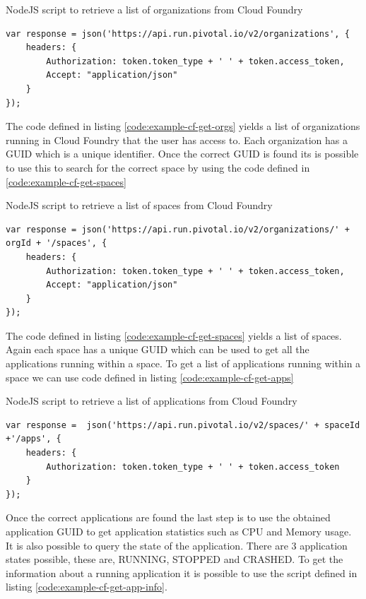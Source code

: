 \begin{listing}[H]
    \caption{NodeJS script to retrieve a list of organizations from Cloud Foundry}
    \label{code:example-cf-get-orgs}
    \begin{verbatim}
var response = json('https://api.run.pivotal.io/v2/organizations', {
    headers: {
        Authorization: token.token_type + ' ' + token.access_token,
        Accept: "application/json"
    }
});
\end{verbatim}
\end{listing}

The code defined in listing \ref{code:example-cf-get-orgs} yields a list of organizations running in Cloud Foundry that the user has access to. Each organization has a GUID which is a unique identifier. Once  the correct GUID is found its is possible to use this to search for the correct space by using the code defined in \ref{code:example-cf-get-spaces}

\begin{listing}[H]
    \caption{NodeJS script to retrieve a list of spaces from Cloud Foundry}
    \label{code:example-cf-get-spaces}
\begin{verbatim}
var response = json('https://api.run.pivotal.io/v2/organizations/' + orgId + '/spaces', {
    headers: {
        Authorization: token.token_type + ' ' + token.access_token,
        Accept: "application/json"
    }
});
\end{verbatim}
\end{listing}

The code defined in listing \ref{code:example-cf-get-spaces} yields a list of spaces. Again each space has a unique GUID which can be used to get all the applications running within a space. To get a list of applications running within a space we can use code defined in listing \ref{code:example-cf-get-apps}

\begin{listing}[H]
    \caption{NodeJS script to retrieve a list of applications from Cloud Foundry}
    \label{code:example-cf-get-apps}
\begin{verbatim}
var response =  json('https://api.run.pivotal.io/v2/spaces/' + spaceId +'/apps', {
    headers: {
        Authorization: token.token_type + ' ' + token.access_token
    }
});
\end{verbatim}
\end{listing}

Once the correct applications are found the last step is to use the obtained application GUID to get application statistics such as CPU and Memory usage. It is also possible to query the state of the application. There are 3 application states possible, these are, RUNNING, STOPPED and CRASHED. To get the information about a running application it is possible to use the script defined in listing \ref{code:example-cf-get-app-info}. 

